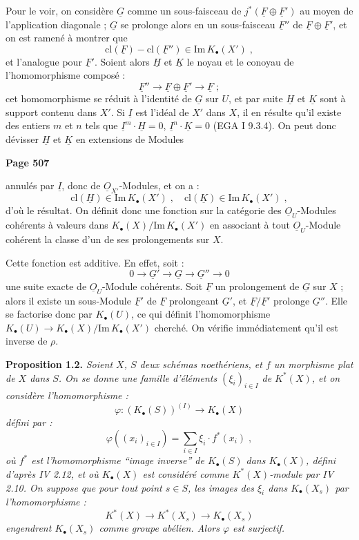 Pour le voir, on consid\`ere $\underline{G}$ comme un sous-faisceau de $j^*(\underline{F} \oplus \underline{F}')$ au moyen de l'application diagonale ; $\underline{G}$ se prolonge alors en un sous-faisceau $\underline{F}''$ de $\underline{F} \oplus \underline{F}'$, et on est ramen\'e \`a montrer que
\[
\mathrm{cl}(\underline{F}) - \mathrm{cl}(\underline{F}'') \in \mathrm{Im}\,K_\bullet(X')\;,
\]
et l'analogue pour $\underline{F}'$. Soient alors $\underline{H}$ et $\underline{K}$ le noyau et le conoyau de l'homomorphisme compos\'e :
\[
\underline{F}'' \longrightarrow \underline{F} \oplus \underline{F}' \longrightarrow \underline{F}\;;
\]
cet homomorphisme se r\'eduit \`a l'identit\'e de $\underline{G}$ sur $U$, et par suite $\underline{H}$ et $\underline{K}$ sont \`a support contenu dans $X'$. Si $\underline{I}$ est l'id\'eal de $X'$ dans $X$, il en r\'esulte qu'il existe des entiers $m$ et $n$ tels que $\underline{I}^m \cdot \underline{H} = 0$, $\underline{I}^n \cdot \underline{K} = 0$ (EGA I 9.3.4). On peut donc d\'evisser $\underline{H}$ et $\underline{K}$ en extensions de Modules

\newpage
\noindent\textbf{Page 507}

annul\'es par $\underline{I}$, donc de $\underline{O}_{X'}$-Modules, et on a :
\[
\mathrm{cl}(\underline{H}) \in \mathrm{Im}\,K_\bullet(X')\;,\quad \mathrm{cl}(\underline{K}) \in \mathrm{Im}\,K_\bullet(X')\;,
\]
d'o\`u le r\'esultat. On d\'efinit donc une fonction sur la cat\'egorie des $\underline{O}_U$-Modules coh\'erents \`a valeurs dans $K_\bullet(X)/\mathrm{Im}\,K_\bullet(X')$ en associant \`a tout $\underline{O}_U$-Module coh\'erent la classe d'un de ses prolongements sur $X$.

Cette fonction est additive. En effet, soit :
\[
0 \longrightarrow \underline{G}' \longrightarrow \underline{G} \longrightarrow \underline{G}'' \longrightarrow 0
\]
une suite exacte de $\underline{O}_U$-Module coh\'erents. Soit $\underline{F}$ un prolongement de $\underline{G}$ sur $X$ ; alors il existe un sous-Module $\underline{F}'$ de $\underline{F}$ prolongeant $\underline{G}'$, et $\underline{F}/\underline{F}'$ prolonge $\underline{G}''$. Elle se factorise donc par $K_\bullet(U)$, ce qui d\'efinit l'homomorphisme $K_\bullet(U) \longrightarrow K_\bullet(X)/\mathrm{Im}\,K_\bullet(X')$ cherch\'e. On v\'erifie imm\'ediatement qu'il est inverse de $\rho$.

\smallskip
\noindent\textbf{Proposition 1.2.} \textit{Soient $X$, $S$ deux sch\'emas noeth\'eriens, et $f$ un morphisme plat de $X$ dans $S$. On se donne une famille d'\'el\'ements $(\xi_i)_{i \in I}$ de $K^*(X)$, et on consid\`ere l'homomorphisme :
\[
\varphi : (K_\bullet(S))^{(I)} \longrightarrow K_\bullet(X)
\]
d\'efini par :
\[
\varphi((x_i)_{i \in I}) = \sum_{i \in I} \xi_i \cdot f^*(x_i)\;,
\]
o\`u $f^*$ est l'homomorphisme ``image inverse'' de $K_\bullet(S)$ dans $K_\bullet(X)$, d\'efini d'apr\`es IV 2.12, et o\`u $K_\bullet(X)$ est consid\'er\'e comme $K^*(X)$-module par IV 2.10. On suppose que pour tout point $s \in S$, les images des $\xi_i$ dans $K_\bullet(X_s)$ par l'homomorphisme :
\[
K^*(X) \longrightarrow K^*(X_s) \longrightarrow K_\bullet(X_s)
\]
engendrent $K_\bullet(X_s)$ comme groupe ab\'elien. Alors $\varphi$ est surjectif.}


